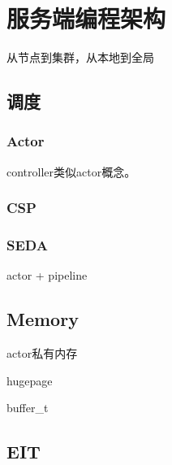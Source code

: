 \chapter{服务端编程架构}

从节点到集群，从本地到全局

\section{调度}

\subsection{Actor}

controller类似actor概念。

\subsection{CSP}

\subsection{SEDA}

actor + pipeline

\section{Memory}

\begin{enumbox}
\item actor私有内存
\item hugepage
\item buffer\_t
\end{enumbox}

\section{EIT}
